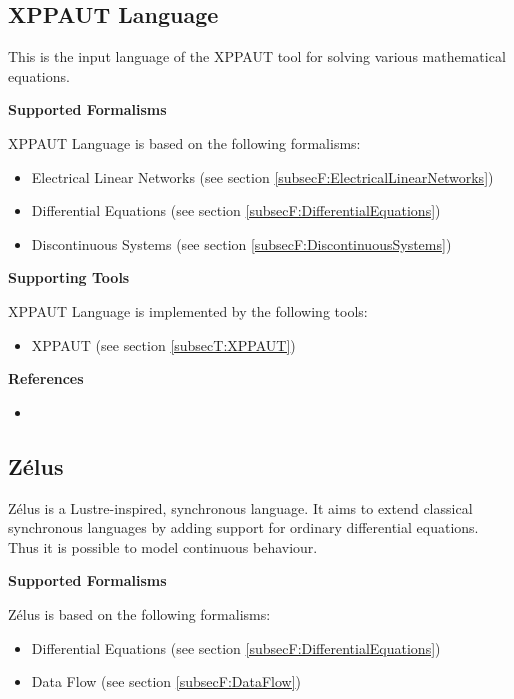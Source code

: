 \subsection{XPPAUT Language}
\label{subsecL:XPPAUTLanguage}


This is the input language of the XPPAUT tool for solving various mathematical equations.

\textbf{Supported Formalisms}

XPPAUT Language is based on the following formalisms:
\begin{itemize}
	\item Electrical Linear Networks (see section \ref{subsecF:ElectricalLinearNetworks})
	\item Differential Equations (see section \ref{subsecF:DifferentialEquations})
	\item Discontinuous Systems (see section \ref{subsecF:DiscontinuousSystems})
\end{itemize}


\textbf{Supporting Tools}

XPPAUT Language is implemented by the following tools:
\begin{itemize}
	\item XPPAUT (see section \ref{subsecT:XPPAUT})
\end{itemize}


\textbf{References}
\begin{itemize}
	
\item {}
\end{itemize}



\subsection{Z\'elus}
\label{subsecL:Zelus}


Z\'elus is a Lustre-inspired, synchronous language. It aims to extend classical synchronous languages by adding support for ordinary differential equations. Thus it is possible to model continuous behaviour.

\textbf{Supported Formalisms}

Z\'elus is based on the following formalisms:
\begin{itemize}
	\item Differential Equations (see section \ref{subsecF:DifferentialEquations})
	\item Data Flow (see section \ref{subsecF:DataFlow})
\end{itemize}


